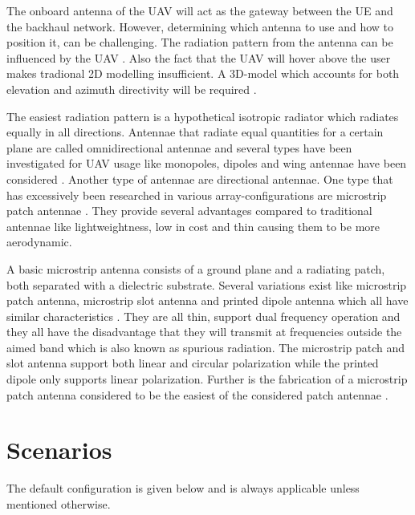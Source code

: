 \documentclass[twocolumn]{phdsymp} %
\begin{document}
The onboard antenna of the \gls{UAV} will act as the gateway between the UE and the backhaul network.
However, determining which antenna to use and how to position it, can be challenging.
The radiation pattern from the antenna can be influenced by the \gls{UAV} \cite{A1}.
Also the fact that the \gls{UAV} will hover above the user makes tradional 2D modelling insufficient.
A 3D-model which accounts for both elevation and azimuth directivity 
will be required \cite{U12}.

The easiest radiation pattern is a hypothetical isotropic radiator which radiates equally in all directions.
Antennae that radiate equal quantities for a certain plane are called omnidirectional antennae \cite{U12} and several types 
have been investigated for \gls{UAV} usage like monopoles, dipoles and wing antennae 
have been considered \cite{A4,A10,A11,A12}.
Another type of antennae are directional antennae. One type 
that has excessively been researched in various array-configurations are microstrip patch antennae \cite{A5,A6,A8}.
They provide several advantages compared to traditional antennae \cite{J13_microstripadvantages, J14_antennadesign}
like lightweightness, low in cost and thin causing them to be more aerodynamic. 

A basic microstrip antenna consists of a ground plane and
a radiating patch, both separated with a dielectric substrate. 
Several variations exist like microstrip patch antenna, microstrip slot antenna and printed dipole antenna which
all have similar characteristics \cite{J13_microstripadvantages, J14_antennadesign}. They are all thin, support dual frequency operation and they all have the disadvantage that 
they 
will transmit at frequencies outside the aimed band which is also known as
spurious radiation. The microstrip patch and slot antenna support both linear
and circular polarization while the printed dipole only supports linear polarization. Further is the fabrication of a microstrip patch antenna considered to be the easiest 
of the considered patch antennae \cite{J13_microstripadvantages}. 


\section{Scenarios}
The default configuration is given below and is always applicable unless mentioned otherwise. 
\end{document}
